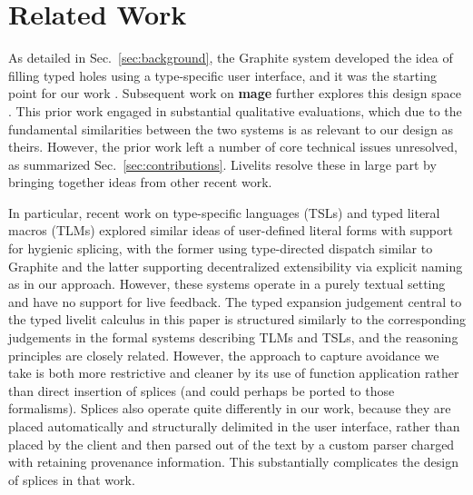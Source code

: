 \section{Related Work}\label{sec:related-work}
As detailed in Sec.~\ref{sec:background},
the Graphite system developed the idea of filling 
typed holes using a type-specific user interface, and it was the starting 
point for our work \cite{Graphite}.
Subsequent work on \textbf{mage} further explores this design space \cite{DBLP:conf/uist/KeryRHMWP20}.
This prior work engaged in substantial qualitative evaluations, 
which due to the fundamental similarities between the two systems 
is as relevant to our design as theirs. However, the prior work 
left a number of core technical issues unresolved,
as summarized Sec.~\ref{sec:contributions}.
Livelits resolve these in large part by bringing together  ideas from other recent work.

In particular, recent work on type-specific languages (TSLs) \cite{TSLs} 
and typed literal macros (TLMs) \cite{TLMs}
explored similar ideas of user-defined
literal forms with support for hygienic splicing, with the former 
using type-directed dispatch similar to Graphite and the latter supporting 
decentralized extensibility via explicit naming as in our approach. 
However, these systems operate in a purely 
textual setting and have no support for live feedback.
The typed expansion judgement central to the typed livelit calculus in this paper 
is structured similarly 
to the corresponding judgements in the formal systems describing TLMs and TSLs,
and the reasoning principles are closely related. However, the  
approach to capture avoidance we take is both more restrictive and cleaner by its use of function application 
rather than direct insertion of splices (and could perhaps be ported to those formalisms).
Splices also operate quite differently in our work,
because they are placed automatically and structurally delimited in the user interface, rather than 
placed by the client and then parsed out of the text by a custom parser charged 
with retaining provenance information.
This substantially complicates the design of splices in that work.

